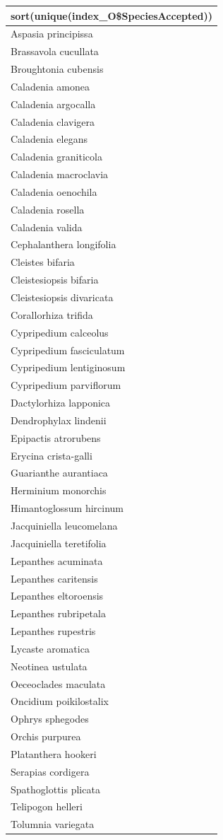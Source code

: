 \documentclass[
]{book}
\theoremstyle{definition}
\theoremstyle{definition}
\theoremstyle{definition}
\theoremstyle{definition}
\theoremstyle{remark}
\begin{document}
\begin{longtable}{l}
\toprule
sort(unique(index\_O\$SpeciesAccepted)) \\ 
\midrule\addlinespace[2.5pt]
Aspasia principissa \\ 
Brassavola cucullata \\ 
Broughtonia cubensis \\ 
Caladenia amonea \\ 
Caladenia argocalla \\ 
Caladenia clavigera \\ 
Caladenia elegans \\ 
Caladenia graniticola \\ 
Caladenia macroclavia \\ 
Caladenia oenochila \\ 
Caladenia rosella \\ 
Caladenia valida \\ 
Cephalanthera longifolia \\ 
Cleistes bifaria \\ 
Cleistesiopsis bifaria \\ 
Cleistesiopsis divaricata \\ 
Corallorhiza trifida \\ 
Cypripedium calceolus \\ 
Cypripedium fasciculatum \\ 
Cypripedium lentiginosum \\ 
Cypripedium parviflorum \\ 
Dactylorhiza lapponica \\ 
Dendrophylax lindenii \\ 
Epipactis atrorubens \\ 
Erycina crista-galli \\ 
Guarianthe aurantiaca \\ 
Herminium monorchis \\ 
Himantoglossum hircinum \\ 
Jacquiniella leucomelana \\ 
Jacquiniella teretifolia \\ 
Lepanthes acuminata \\ 
Lepanthes caritensis \\ 
Lepanthes eltoroensis \\ 
Lepanthes rubripetala \\ 
Lepanthes rupestris \\ 
Lycaste aromatica \\ 
Neotinea ustulata \\ 
Oeceoclades maculata \\ 
Oncidium poikilostalix \\ 
Ophrys sphegodes \\ 
Orchis purpurea \\ 
Platanthera hookeri \\ 
Serapias cordigera \\ 
Spathoglottis plicata \\ 
Telipogon helleri \\ 
Tolumnia variegata \\ 
\bottomrule
\end{longtable}
\end{document}

